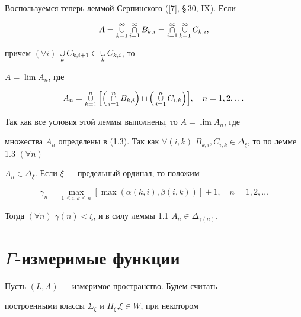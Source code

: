 \begin{pf}
 


Воспользуемся теперь леммой Серпинского ([7], \S\,30, IX). Если 


$$ 


A=\mycup^\infty_{k=1}\mycap^\infty_{i=1}B_{k,i}= 


\mycap^\infty_{i=1}\mycup^\infty_{k=1}C_{k,i}, 


$$ 


причем $(\forall i)$ $\mathop{\cup}\limits_k C_{k,i+1}\subset \mathop{\cup}\limits_k C_{k,i}$, то 


$A=\lim A_n$, где 


\begin{equation} 


A_n=\mycup^n_{k=1}\Big[\Big(\mycap^n_{i=1}B_{k,i}\Big)\cap 


\Big(\mycup^n_{i=1}C_{i,k}\Big)\Big],\quad n=1,2,\dotsc 


\end{equation} 


 


Так как все условия этой леммы выполнены, то $A=\lim A_n$, где 


множества $A_n$ определены в (1.3). Так как $\forall (i,k)$ $B_{k,i}, 


C_{i,k}\in\Delta_\xi$, то по лемме 1.3 $(\forall n)$ 


$A_n\in\Delta_\xi$. Если $\xi$ --- предельный ординал, то положим 


$$ 


\gamma_n=\max_{1\le i,k\le n}[\max(\alpha(k,i),\beta(i,k))]+1, 


\quad n=1,2,\dotsc 


$$ 


Тогда $(\forall n)$ $\gamma(n)<\xi$, и в силу леммы 1.1 $A_n\in 


\Delta_{\gamma(n)}$. 


\end{pf} 


 


 


\section{$\Gamma$-измеримые функции} 


 


Пусть $(L,\Lambda)$ --- измеримое пространство. Будем считать 


построенными классы $\Sigma_\xi$ и $\Pi_\xi$,\linebreak $\xi\in W$, при некотором 


